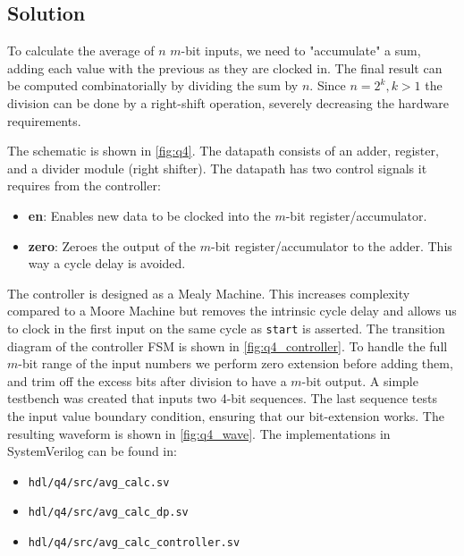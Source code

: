 \documentclass[../main.tex]{subfiles}
\begin{document}
\subsection*{Solution}

To calculate the average of $n$ $m$-bit inputs, we need to "accumulate" a sum, adding each value with the previous as they are clocked in. The final result can be computed combinatorially by dividing the sum by $n$. Since $n = 2^k, k > 1$ the division can be done by a right-shift operation, severely decreasing the hardware requirements.

The schematic is shown in \cref{fig:q4}. The datapath consists of an adder, register, and a divider module (right shifter). The datapath has two control signals it requires from the controller:

\begin{itemize}
    \item \textbf{en}: Enables new data to be clocked into the $m$-bit register/accumulator.
    \item \textbf{zero}: Zeroes the output of the $m$-bit register/accumulator to the adder. This way a cycle delay is avoided. 
\end{itemize}

The controller is designed as a Mealy Machine. This increases complexity compared to a Moore Machine but removes the intrinsic cycle delay and allows us to clock in the first input on the same cycle as \lstinline{start} is asserted. The transition diagram of the controller FSM is shown in \cref{fig:q4_controller}. To handle the full $m$-bit range of the input numbers we perform zero extension before adding them, and trim off the excess bits after division to have a $m$-bit output. A simple testbench was created that inputs two 4-bit sequences. The last sequence tests the input value boundary condition, ensuring that our bit-extension works. The resulting waveform is shown in \cref{fig:q4_wave}. The implementations in SystemVerilog can be found in:

\begin{itemize}
    \item \lstinline{hdl/q4/src/avg_calc.sv}
    \item \lstinline{hdl/q4/src/avg_calc_dp.sv}
    \item \lstinline{hdl/q4/src/avg_calc_controller.sv}
\end{itemize}

\newpage
\end{document}
